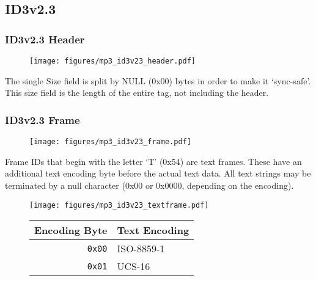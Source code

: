 \clearpage

\subsection{ID3v2.3}
\subsubsection{ID3v2.3 Header}
\begin{figure}[h]
\texttt{[image: figures/mp3\_id3v23\_header.pdf]}
\end{figure}
\par
\noindent
The single Size field is split by NULL (0x00) bytes in order to make
it `sync-safe'.
This size field is the length of the entire tag, not including the header.

\subsubsection{ID3v2.3 Frame}
\begin{figure}[h]
\texttt{[image: figures/mp3\_id3v23\_frame.pdf]}
\end{figure}
\par
\noindent
Frame IDs that begin with the letter `T' (0x54) are text frames.
These have an additional text encoding byte before the actual
text data.
All text strings may be terminated by a null character
(0x00 or 0x0000, depending on the encoding).
\begin{figure}[h]
\texttt{[image: figures/mp3\_id3v23\_textframe.pdf]}
\begin{tabular}{r|l}
Encoding Byte & Text Encoding \\
\hline
\texttt{0x00} & ISO-8859-1 \\
\texttt{0x01} & UCS-16 \\
\end{tabular}
\end{figure}

\pagebreak

